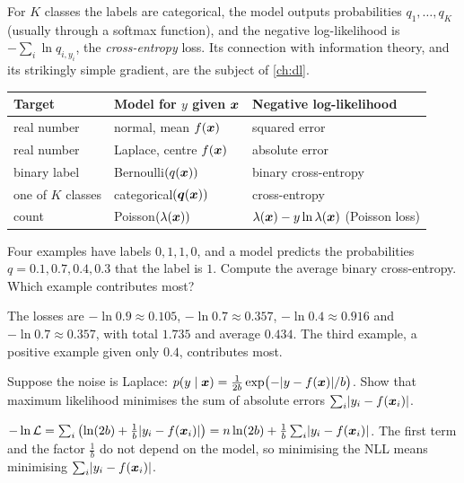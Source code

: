 For $K$ classes the labels are categorical, the model outputs probabilities
$q_1, \dots, q_K$ (usually through a softmax function), and the negative
log-likelihood is $-\sum_i\ln q_{i, y_i}$, the \emph{cross-entropy} loss. Its
connection with information theory, and its strikingly simple gradient, are the
subject of \cref{ch:dl}.

\begin{keytakeaways}
\renewcommand{\arraystretch}{1.3}
\begin{tabular}{@{}lll@{}}
\textbf{Target} & \textbf{Model for $y$ given $\bm{x}$} & \textbf{Negative log-likelihood}\\
\hline
real number & normal, mean $f(\bm{x})$ & squared error\\
real number & Laplace, centre $f(\bm{x})$ & absolute error\\
binary label & Bernoulli$(q(\bm{x}))$ & binary cross-entropy\\
one of $K$ classes & categorical$(\bm{q}(\bm{x}))$ & cross-entropy\\
count & Poisson$(\lambda(\bm{x}))$ & $\lambda(\bm{x}) - y\ln\lambda(\bm{x})$ (Poisson loss)
\end{tabular}
\end{keytakeaways}

\sectionexercises

\begin{exercise}
Four examples have labels $0, 1, 1, 0$, and a model predicts the probabilities
$q = 0.1, 0.7, 0.4, 0.3$ that the label is $1$. Compute the average binary
cross-entropy. Which example contributes most?
\end{exercise}
\begin{solution}
The losses are $-\ln0.9 \approx 0.105$, $-\ln0.7 \approx 0.357$,
$-\ln0.4 \approx 0.916$ and $-\ln0.7 \approx 0.357$, with total $1.735$ and average
$0.434$. The third example, a positive example given only $0.4$, contributes
most.
\end{solution}

\begin{exercise}
Suppose the noise is Laplace: $p(y \mid \bm{x}) = \frac{1}{2b}\exp\bigl(-\lvert y -
f(\bm{x})\rvert/b\bigr)$. Show that maximum likelihood minimises the sum of absolute errors
$\sum_i\lvert y_i - f(\bm{x}_i)\rvert$.
\end{exercise}
\begin{solution}
$-\ln\mathcal{L} = \sum_i\left(\ln(2b) + \tfrac1b\lvert y_i - f(\bm{x}_i)\rvert\right)
= n\ln(2b) + \tfrac1b\sum_i\lvert y_i - f(\bm{x}_i)\rvert$. The first term and the factor
$\tfrac1b$ do not depend on the model, so minimising the NLL means minimising
$\sum_i\lvert y_i - f(\bm{x}_i)\rvert$.
\end{solution}

